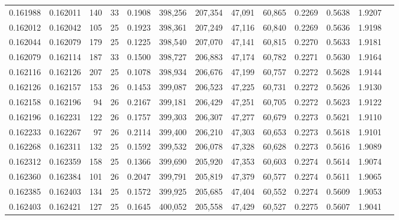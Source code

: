 \begin{tabular}{rrrrrrrrrrrrr}
0.161988 & 0.162011 & 140 &  33 &                                     0.1908 & 398,256 & 207,354 &  47,091 &  60,865 & 0.2269 & 0.5638 & 1.9207 \\
0.162012 & 0.162042 & 105 &  25 &                                     0.1923 & 398,361 & 207,249 &  47,116 &  60,840 & 0.2269 & 0.5636 & 1.9198 \\
0.162044 & 0.162079 & 179 &  25 &                                     0.1225 & 398,540 & 207,070 &  47,141 &  60,815 & 0.2270 & 0.5633 & 1.9181 \\
0.162079 & 0.162114 & 187 &  33 &                                     0.1500 & 398,727 & 206,883 &  47,174 &  60,782 & 0.2271 & 0.5630 & 1.9164 \\
0.162116 & 0.162126 & 207 &  25 &                                     0.1078 & 398,934 & 206,676 &  47,199 &  60,757 & 0.2272 & 0.5628 & 1.9144 \\
0.162126 & 0.162157 & 153 &  26 &                                     0.1453 & 399,087 & 206,523 &  47,225 &  60,731 & 0.2272 & 0.5626 & 1.9130 \\
0.162158 & 0.162196 &  94 &  26 &                                     0.2167 & 399,181 & 206,429 &  47,251 &  60,705 & 0.2272 & 0.5623 & 1.9122 \\
0.162196 & 0.162231 & 122 &  26 &                                     0.1757 & 399,303 & 206,307 &  47,277 &  60,679 & 0.2273 & 0.5621 & 1.9110 \\
0.162233 & 0.162267 &  97 &  26 &                                     0.2114 & 399,400 & 206,210 &  47,303 &  60,653 & 0.2273 & 0.5618 & 1.9101 \\
0.162268 & 0.162311 & 132 &  25 &                                     0.1592 & 399,532 & 206,078 &  47,328 &  60,628 & 0.2273 & 0.5616 & 1.9089 \\
0.162312 & 0.162359 & 158 &  25 &                                     0.1366 & 399,690 & 205,920 &  47,353 &  60,603 & 0.2274 & 0.5614 & 1.9074 \\
0.162360 & 0.162384 & 101 &  26 &                                     0.2047 & 399,791 & 205,819 &  47,379 &  60,577 & 0.2274 & 0.5611 & 1.9065 \\
0.162385 & 0.162403 & 134 &  25 &                                     0.1572 & 399,925 & 205,685 &  47,404 &  60,552 & 0.2274 & 0.5609 & 1.9053 \\
0.162403 & 0.162421 & 127 &  25 &                                     0.1645 & 400,052 & 205,558 &  47,429 &  60,527 & 0.2275 & 0.5607 & 1.9041 \\

\end{tabular}
